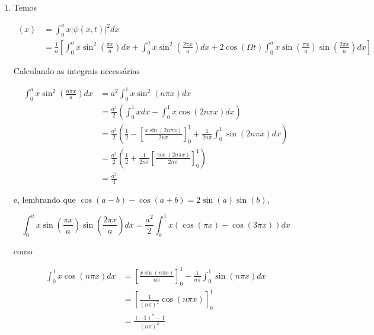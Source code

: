 \documentclass[a4paper, 12pt, notitlepage]{article}
\begin{document}
\begin{enumerate}
\begin{enumerate}
  
  \item Temos
  
  \begin{align*}
  \left\langle x \right\rangle &= \int_0^a x |\psi(x, t)|^2 dx \\
  &= \frac{1}{a} \left[ \int_0^a x \sin^2 \left(\frac{\pi x}{a}\right)dx + \int_0^a x \sin^2 \left(\frac{2\pi x}{a}\right)dx + 2 \cos\left(\Omega t\right) \int_0^a x \sin\left(\frac{\pi x}{a}\right) \sin\left(\frac{2\pi x}{a}\right) dx \right]
  \end{align*}
  
  Calculando as integrais necessárias
  
  \begin{align*}
  \int_0^a x \sin^2\left(\frac{n\pi x}{a}\right) dx &= a^2 \int_0^1 x \sin^2\left(n\pi x\right) dx \\
  &= \frac{a^2}{2} \left(\int_0^1 x dx - \int_0^1 x\cos(2n\pi x) dx\right) \\
  &= \frac{a^2}{2} \left(\frac{1}{2} - \left[\frac{x \sin\left(2 n \pi x\right)}{2n\pi}\right]_0^1 + \frac{1}{2n\pi} \int_0^1 \sin(2n \pi x)dx \right) \\
  &= \frac{a^2}{2}\left(\frac{1}{2} + \frac{1}{2n\pi} \left[\frac{\cos(2n\pi x)}{2n\pi}\right]_0^1 \right) \\
  &= \frac{a^2}{4}
  \end{align*}
  
  e, lembrando que $\cos(a - b) - \cos(a + b) = 2 \sin(a) \sin(b)$,
  
  \begin{equation*}
  \int_0^a x \sin\left(\frac{\pi x}{a}\right) \sin\left(\frac{2\pi x}{a}\right) dx = \frac{a^2}{2} \int_0^1 x\left(\cos(\pi x) - \cos(3\pi x)\right)dx
  \end{equation*}
  
  como
  
  \begin{align*}
  \int_0^1 x \cos(n \pi x) dx &= \left[\frac{x \sin(n\pi x)}{n\pi}\right]_0^1 - \frac{1}{n\pi} \int_0^1 \sin(n\pi x) dx \\
  &= \left[\frac{1}{(n\pi)^2} \cos(n\pi x)\right]_0^1 \\
  &= \frac{(-1)^n - 1}{(n\pi)^2}
  \end{align*}
  

\end{enumerate}
\end{enumerate}
\end{document}
